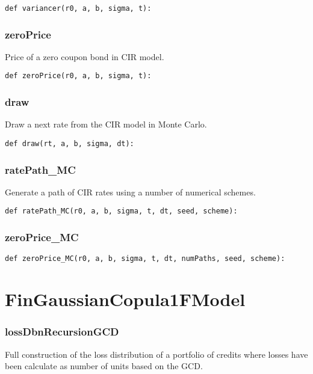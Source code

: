 \documentclass[twoside,11pt]{book}
\begin{document}
\begin{lstlisting}
def variancer(r0, a, b, sigma, t):
\end{lstlisting}

\subsubsection*{{\bf zeroPrice}}
Price of a zero coupon bond in CIR model.  

\begin{lstlisting}
def zeroPrice(r0, a, b, sigma, t):
\end{lstlisting}

\subsubsection*{{\bf draw}}
Draw a next rate from the CIR model in Monte Carlo.  

\begin{lstlisting}
def draw(rt, a, b, sigma, dt):
\end{lstlisting}

\subsubsection*{{\bf ratePath\_MC}}
Generate a path of CIR rates using a number of numerical schemes.  

\begin{lstlisting}
def ratePath_MC(r0, a, b, sigma, t, dt, seed, scheme):
\end{lstlisting}

\subsubsection*{{\bf zeroPrice\_MC}}


\begin{lstlisting}
def zeroPrice_MC(r0, a, b, sigma, t, dt, numPaths, seed, scheme):
\end{lstlisting}

\newpage
\section{FinGaussianCopula1FModel}

\subsubsection*{{\bf lossDbnRecursionGCD}}
Full construction of the loss distribution of a portfolio of credits where losses have been calculate as number of units based on the GCD.  
\end{document}
